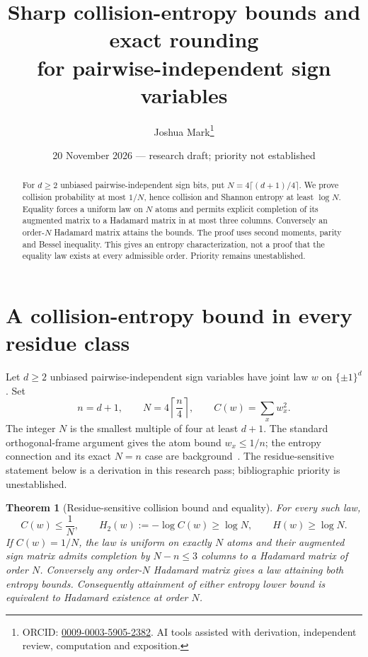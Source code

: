 \documentclass[11pt]{article}
\title{Sharp collision-entropy bounds and exact rounding\\for pairwise-independent sign variables}
\author{Joshua Mark\thanks{ORCID: \href{https://orcid.org/0009-0003-5905-2382}{0009-0003-5905-2382}. AI tools assisted with derivation, independent review, computation and exposition.}}
\date{20 November 2026 --- research draft; priority not established}
\newtheorem{theorem}{Theorem}[section]
\begin{document}
\maketitle
\begin{abstract}
For $d\ge2$ unbiased pairwise-independent sign bits, put
$N=4\lceil(d+1)/4\rceil$. We prove collision probability at most
$1/N$, hence collision and Shannon entropy at least $\log N$.
Equality forces a uniform law on $N$ atoms and permits explicit
completion of its augmented matrix to a Hadamard matrix in at most
three columns. Conversely an order-$N$ Hadamard matrix attains the
bounds. The proof uses second moments, parity and Bessel inequality.
This gives an entropy characterization, not a proof that the equality
law exists at every admissible order. Priority remains unestablished.
\end{abstract}
\section{A collision-entropy bound in every residue class}
\label{sec:residue-bound}
Let $d\ge2$ unbiased pairwise-independent sign variables have joint
law $w$ on $\{\pm1\}^d$. Set
\[
 n=d+1,\qquad N=4\left\lceil\frac n4\right\rceil,
 \qquad C(w)=\sum_xw_x^2.
\]
The integer $N$ is the smallest multiple of four at least $d+1$.
The standard orthogonal-frame argument gives the atom bound
$w_x\le1/n$; the entropy connection and its exact $N=n$ case are
background~\cite{GP}. The residue-sensitive statement below is a
derivation in this research pass; bibliographic priority is unestablished.

\begin{theorem}[Residue-sensitive collision bound and equality]
\label{thm:residue-bound}
For every such law,
\[
 C(w)\le\frac1N,\qquad
 H_2(w):=-\log C(w)\ge\log N,\qquad H(w)\ge\log N.
\]
If $C(w)=1/N$, the law is uniform on exactly $N$ atoms and their
augmented sign matrix admits completion by $N-n\le3$ columns to a
Hadamard matrix of order $N$. Conversely any order-$N$ Hadamard matrix
gives a law attaining both entropy bounds. Consequently attainment
of either entropy lower bound is equivalent to Hadamard existence
at order $N$.
\end{theorem}
\end{document}
